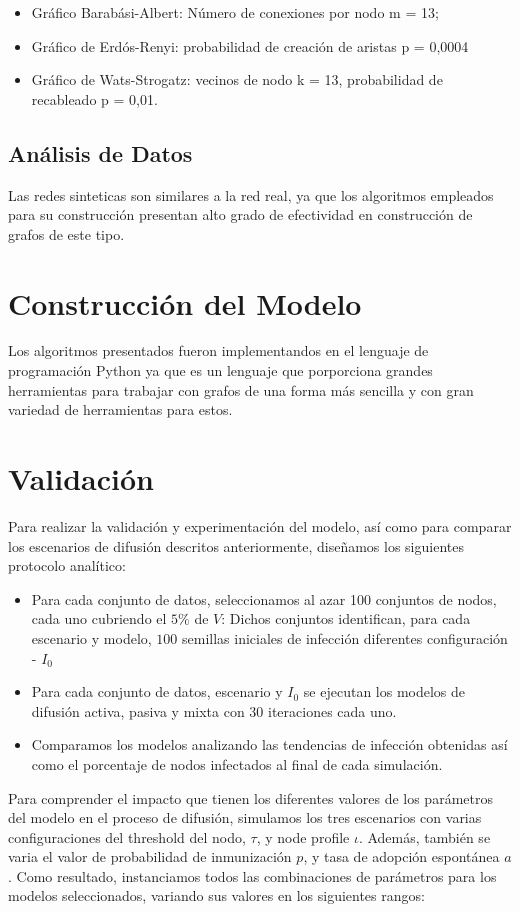 \documentclass{article}
\begin{document}
\begin{itemize}
\item Gráfico Barabási-Albert: Número de conexiones por nodo m = 13;
\item Gráfico de Erdós-Renyi: probabilidad de creación de aristas p = 0,0004
\item Gráfico de Wats-Strogatz: vecinos de nodo k = 13, probabilidad de recableado p = 0,01.
\end{itemize} 
 \subsection{Análisis de Datos}	
Las redes sinteticas son similares a la red real, ya que los algoritmos empleados para su construcción presentan alto grado de efectividad en construcción de grafos de este tipo. 
	
\section{Construcción del Modelo}
Los algoritmos presentados fueron implementandos en el lenguaje de programación Python ya que es un lenguaje que porporciona grandes herramientas para trabajar con grafos de una forma más sencilla y con gran variedad de herramientas para estos.

\section{Validación}
Para realizar la validación y experimentación del modelo, así como para comparar los escenarios de difusión descritos anteriormente, diseñamos los siguientes protocolo analítico:
\begin{itemize}
\item Para cada conjunto de datos, seleccionamos al azar 100 conjuntos de nodos, cada uno cubriendo el $5\%$ de $V$: Dichos conjuntos identifican, para cada escenario y modelo, $100$ semillas iniciales de infección diferentes configuración - $I_0$
\item Para cada conjunto de datos, escenario y $I_0$ se ejecutan los modelos de difusión activa, pasiva y mixta con 30 iteraciones cada uno.
\item Comparamos los modelos analizando las tendencias de infección obtenidas así como el porcentaje de nodos infectados al final de cada simulación.
\end{itemize}
Para comprender el impacto que tienen los diferentes valores de los parámetros del modelo en el proceso de difusión, simulamos los tres escenarios con varias configuraciones del threshold del nodo, $τ$, y node profile $\iota$. Además, también se varia el valor de probabilidad de inmunización $p$, y tasa de adopción espontánea $a$. Como resultado, instanciamos todos las combinaciones de parámetros para los modelos seleccionados, variando sus valores en los siguientes rangos:
\end{document}
